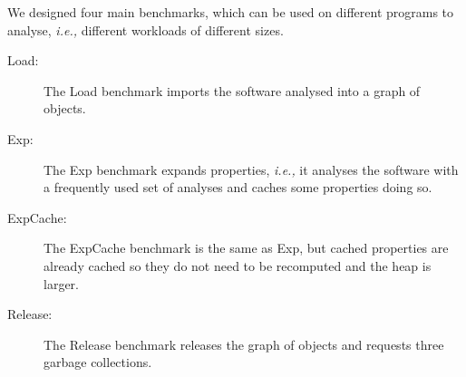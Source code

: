 \documentclass[sigplan,10pt,review,anonymous]{acmart}\settopmatter{printfolios=true,printccs=false,printacmref=false}
\def\ie{\emph{i.e., }}
\begin{document}
We designed four main benchmarks, which can be used on different programs to analyse, \ie different workloads of different sizes. 
\begin{description}
	\item[Load:] The Load benchmark imports the software analysed into a graph of objects.
	\item[Exp:] The Exp benchmark expands properties, \ie it analyses the software with a frequently used set of analyses %
	and caches some properties doing so.	
	\item[ExpCache:] The ExpCache benchmark is the same as Exp, but cached properties are already cached so they do not need to be recomputed and the heap is larger.
	\item[Release:] The Release benchmark releases the graph of objects and requests three garbage collections.
\end{description}

\end{document}
